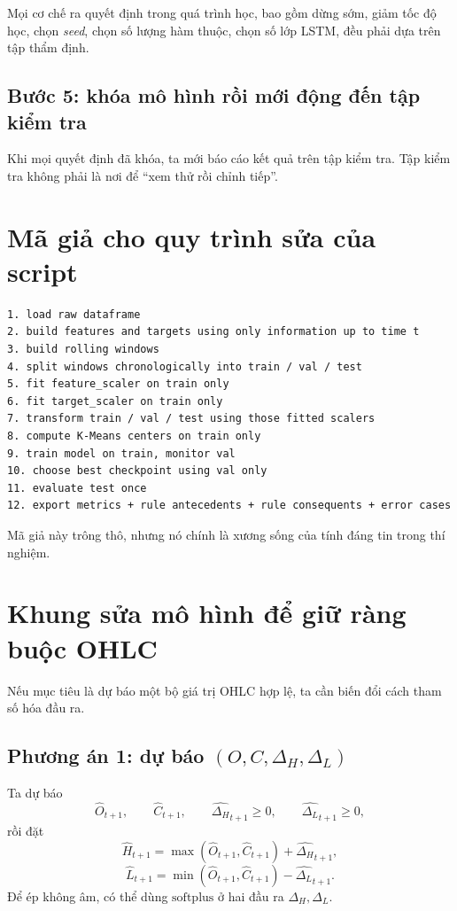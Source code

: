 Mọi cơ chế ra quyết định trong quá trình học, bao gồm dừng sớm, giảm tốc độ học, chọn \emph{seed}, chọn số lượng hàm thuộc, chọn số lớp LSTM, đều phải dựa trên tập thẩm định.

\subsection{Bước 5: khóa mô hình rồi mới động đến tập kiểm tra}

Khi mọi quyết định đã khóa, ta mới báo cáo kết quả trên tập kiểm tra. Tập kiểm tra không phải là nơi để ``xem thử rồi chỉnh tiếp''.

\section{Mã giả cho quy trình sửa của script}

\begin{verbatim}
1. load raw dataframe
2. build features and targets using only information up to time t
3. build rolling windows
4. split windows chronologically into train / val / test
5. fit feature_scaler on train only
6. fit target_scaler on train only
7. transform train / val / test using those fitted scalers
8. compute K-Means centers on train only
9. train model on train, monitor val
10. choose best checkpoint using val only
11. evaluate test once
12. export metrics + rule antecedents + rule consequents + error cases
\end{verbatim}

Mã giả này trông thô, nhưng nó chính là xương sống của tính đáng tin trong thí nghiệm.

\section{Khung sửa mô hình để giữ ràng buộc OHLC}

Nếu mục tiêu là dự báo một bộ giá trị OHLC hợp lệ, ta cần biến đổi cách tham số hóa đầu ra.

\subsection{Phương án 1: dự báo \((O,C,\Delta_H,\Delta_L)\)}

Ta dự báo
\[
\hat{O}_{t+1},\qquad \hat{C}_{t+1},\qquad \widehat{\Delta_H}_{t+1}\ge 0,\qquad \widehat{\Delta_L}_{t+1}\ge 0,
\]
rồi đặt
\[
\hat{H}_{t+1} = \max(\hat{O}_{t+1},\hat{C}_{t+1}) + \widehat{\Delta_H}_{t+1},
\]
\[
\hat{L}_{t+1} = \min(\hat{O}_{t+1},\hat{C}_{t+1}) - \widehat{\Delta_L}_{t+1}.
\]
Để ép không âm, có thể dùng \(\mathrm{softplus}\) ở hai đầu ra \(\Delta_H,\Delta_L\).

